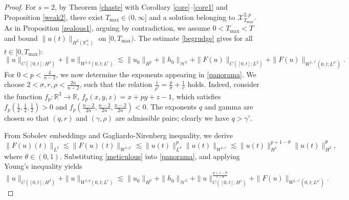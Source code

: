 \documentclass[preprint,compress,12pt]{elsarticle}
\numberwithin{equation}{section}
\begin{document}
\begin{proof}
	For $s=2$, by Theorem \ref{chaste} with Corollary \ref{core}--\ref{core1} and Proposition \ref{weak2}, there exist $T_{\max}\in(0,\infty]$ and a solution belonging to $\mathscr{X}^{2,p}_{T_{\max}}$. As in Proposition \ref{zealous1}, arguing by contradiction, we assume  $0<T_{\max}<T$ and  bound $\|u(t)\|_{H^{2}(\mathbb{R}^{n}_{+})}$ on $[0,T_{\max})$. The  estimate  \eqref{begrudge} gives for all $t \in [0,T_{\max})$:
	\begin{equation}\label{panorama} 		
		\|u\|_{C([0,t];H^{2})}+\|u\|_{W^{1,q}(0,t;L^{r})}
		\lesssim\|u_{0}\|_{H^{2}}+\|h_{0}\|_{\mathcal{H}^{2}}+ \|F(u)\|_{C([0,t];L^{2})}+\|F(u)\|_{W^{1,\gamma'}(0,t;L^{\rho'})}.
	\end{equation}
	For $0< p < \frac{4}{n-2}$, we now determine the exponents appearing in \eqref{panorama}. We choose  $2<\sigma,r,\rho<\frac{2n}{n-2}$, such that the relation
	$\frac{1}{\rho'}= \frac{p}{\sigma}+\frac{1}{r}$ holds. Indeed, consider the function $f_{p}:\mathbb{R}^{3}\rightarrow \mathbb{R}$, $f_{p}(x,y,z)=x+py+z-1$, which satisfies  $f_{p}(\frac{1}{2},\frac{1}{2},\frac{1}{2})>0$ and $f_{p}(\frac{n-2}{2n},\frac{n-2}{2n},\frac{n-2}{2n})<0$. The exponents $q$ and gamma are chosen so that $(q,r)$ and $(\gamma,\rho)$ are admissible pairs; clearly we have  $q>\gamma'$.
	
	From Sobolev embeddings and Gagliardo-Nirenberg inequality, we derive
	\begin{equation}\label{meticulous}
		\|F(u)(t)\|_{L^{2}}\lesssim \|F(u)(t)\|_{W^{1,\rho'}}\lesssim \|u(t)\|_{L^{\sigma}}^{p} \|u(t)\|_{W^{1,r}}\lesssim \|u(t)\|_{H^{1}}^{p+1-\theta} \|u(t)\|_{H^{2}}^{\theta},
	\end{equation}
	where $\theta\in(0,1)$. Substituting \eqref{meticulous} into \eqref{panorama}, and applying  Young's inequality yields
	\begin{equation}\label{transient} \|u\|_{C([0,t];H^{2})}+\|u\|_{W^{1,q}(0,t;L^{r})}\lesssim \|u_{0}\|_{H^{2}}+\|h_{0}\|_{\mathcal{H}^{2}}+ \|u\|_{C([0,t];H^{1})}^{\frac{p+1-\theta}{1-\theta}}+\|F(u)\|_{W^{1,\gamma'}(0,t;L^{\rho'})}.
	\end{equation}
	

\end{proof}
\end{document}
